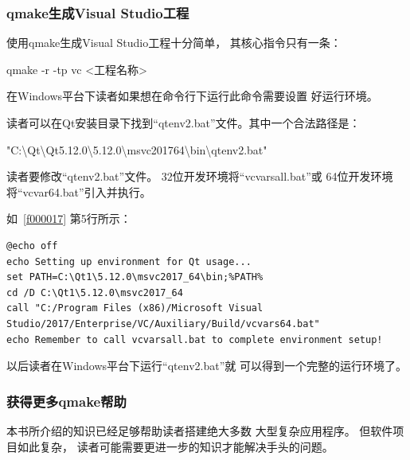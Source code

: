 \FloatBarrier
\subsubsection{
qmake生成Visual Studio工程
}\label{ss000910}

使用qmake生成Visual Studio工程十分简单，
其核心指令只有一条：

    \begin{center}
        \sourcefontone{}qmake -r -tp vc <工程名称>
    \end{center}

在Windows平台下读者如果想在命令行下运行此命令需要设置
好运行环境。


读者可以在Qt安装目录下找到“qtenv2.bat”文件。其中一个合法路径是：
\begin{littlelongworld}
"C:\textbackslash{}Qt\textbackslash{}Qt5.12.0\textbackslash{}5.12.0\textbackslash{}msvc2017\underline{\hspace{0.5em}}64\textbackslash{}bin\textbackslash{}qtenv2.bat"
\end{littlelongworld}

读者要修改“qtenv2.bat”文件。
32位开发环境将“vcvarsall.bat”或
64位开发环境将“vcvar64.bat”引入并执行。

如\lstlistingname\ \ref{f000017}
第5行所示：
\begin{lstlisting}[label=f000017,
caption=GoodLuck,
title=\lstlistingname\ \thelstlisting
]
@echo off
echo Setting up environment for Qt usage...
set PATH=C:\Qt1\5.12.0\msvc2017_64\bin;%PATH%
cd /D C:\Qt1\5.12.0\msvc2017_64
call "C:/Program Files (x86)/Microsoft Visual Studio/2017/Enterprise/VC/Auxiliary/Build/vcvars64.bat"
echo Remember to call vcvarsall.bat to complete environment setup!
\end{lstlisting}          %

以后读者在Windows平台下运行“qtenv2.bat”就
可以得到一个完整的运行环境了。

\FloatBarrier
\subsubsection{
获得更多qmake帮助
}\label{ss000a10}


本书所介绍的知识已经足够帮助读者搭建绝大多数
大型复杂应用程序。
但软件项目如此复杂，
读者可能需要更进一步的知识才能解决手头的问题。

